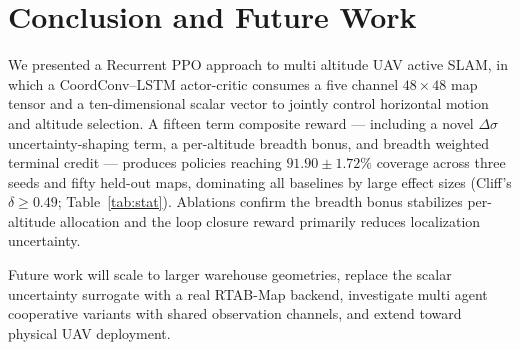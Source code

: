 \documentclass[conference]{IEEEtran}
\begin{document}
\section{Conclusion and Future Work}
We presented a Recurrent PPO approach to multi altitude UAV active SLAM, in which a CoordConv--LSTM actor-critic consumes a five channel $48{\times}48$ map tensor and a ten-dimensional scalar vector to jointly control horizontal motion and altitude selection. A fifteen term composite reward --- including a novel $\Delta\sigma$ uncertainty-shaping term, a per-altitude breadth bonus, and breadth weighted terminal credit --- produces policies reaching $91.90\!\pm\!1.72\%$ coverage across three seeds and fifty held-out maps, dominating all baselines by large effect sizes (Cliff's $\delta\!\geq\!0.49$; Table~\ref{tab:stat}). Ablations confirm the breadth bonus stabilizes per-altitude allocation and the loop closure reward primarily reduces localization uncertainty.

Future work will scale to larger warehouse geometries, replace the scalar uncertainty surrogate with a real RTAB-Map backend, investigate multi agent cooperative variants with shared observation channels, and extend toward physical UAV deployment.

\balance


\end{document}
